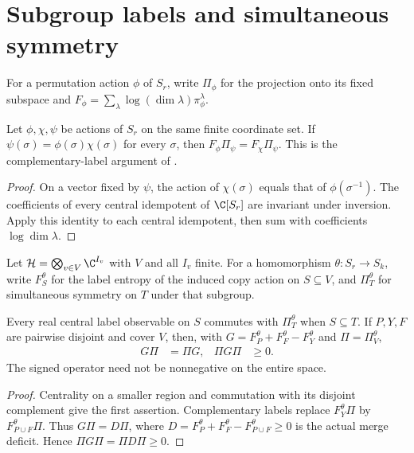 \section{Subgroup labels and simultaneous symmetry}
\label{sec:grouped_label_symmetric_support}

For a permutation action $\phi$ of $S_r$, write $\Pi_\phi$ for the
projection onto its fixed subspace and
$F_\phi=\sum_\lambda\log(\dim\lambda)\pi_\phi^\lambda$.

\begin{theorem}
\label{thm:complementary_subgroup_label_entropies}
\leanok
Let $\phi,\chi,\psi$ be actions of $S_r$ on the same finite
coordinate set. If $\psi(\sigma)=\phi(\sigma)\chi(\sigma)$ for
every $\sigma$, then $F_\phi\Pi_\psi=F_\chi\Pi_\psi$.
This is the complementary-label argument of
\cite[Lemma~6.1(2)]{OpenAI2026AreaLaw}.
\end{theorem}
\begin{proof}\leanok
On a vector fixed by $\psi$, the action of $\chi(\sigma)$ equals
that of $\phi(\sigma^{-1})$. The coefficients of every central
idempotent of $\C[S_r]$ are invariant under inversion. Apply this
identity to each central idempotent, then sum with coefficients
$\log\dim\lambda$.
\end{proof}

Let $\mathcal H=\bigotimes_{v\in V}\C^{I_v}$ with $V$ and all
$I_v$ finite. For a homomorphism $\theta:S_r\to S_k$, write
$F_S^\theta$ for the label entropy of the induced copy action on
$S\subseteq V$, and $\Pi_T^\theta$ for simultaneous symmetry on
$T$ under that subgroup.

\begin{theorem}
\label{thm:signed_subgroup_label_symmetric_nonnegative}
\leanok
{}
Every real central label observable on $S$ commutes with
$\Pi_T^\theta$ when $S\subseteq T$. If $P,Y,F$ are pairwise
disjoint and cover $V$, then, with
$G=F_P^\theta+F_F^\theta-F_Y^\theta$ and
$\Pi=\Pi_V^\theta$,
\begin{align}
 G\Pi&=\Pi G,&\Pi G\Pi&\ge0.
\end{align}
The signed operator need not be nonnegative on the entire space.
\end{theorem}
\begin{proof}\leanok
Centrality on a smaller region and commutation with its disjoint
complement give the first assertion. Complementary labels replace
$F_Y^\theta\Pi$ by $F_{P\cup F}^\theta\Pi$. Thus
$G\Pi=D\Pi$, where
$D=F_P^\theta+F_F^\theta-F_{P\cup F}^\theta\ge0$ is the actual
merge deficit. Hence $\Pi G\Pi=\Pi D\Pi\ge0$.
\end{proof}

